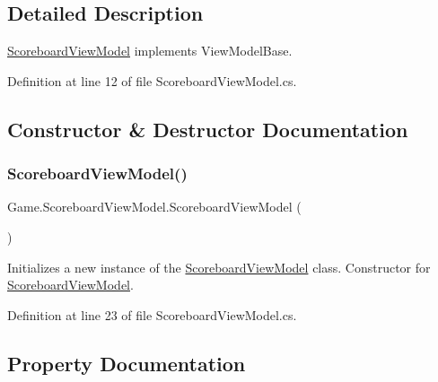 \subsection{Detailed Description}
\mbox{\hyperlink{class_game_1_1_scoreboard_view_model}{Scoreboard\+View\+Model}} implements View\+Model\+Base. 



Definition at line 12 of file Scoreboard\+View\+Model.\+cs.



\subsection{Constructor \& Destructor Documentation}
\mbox{\label{class_game_1_1_scoreboard_view_model_aa8aea0aaf34ff7463a96ed66d2e869c7}} 
\subsubsection{\texorpdfstring{ScoreboardViewModel()}{ScoreboardViewModel()}}
{\footnotesize\ttfamily Game.\+Scoreboard\+View\+Model.\+Scoreboard\+View\+Model (\begin{DoxyParamCaption}{ }\end{DoxyParamCaption})}



Initializes a new instance of the \mbox{\hyperlink{class_game_1_1_scoreboard_view_model}{Scoreboard\+View\+Model}} class. Constructor for \mbox{\hyperlink{class_game_1_1_scoreboard_view_model}{Scoreboard\+View\+Model}}. 



Definition at line 23 of file Scoreboard\+View\+Model.\+cs.



\subsection{Property Documentation}
\mbox{\label{class_game_1_1_scoreboard_view_model_ae97a07beed15f79ca932e61fa8485109}} 
